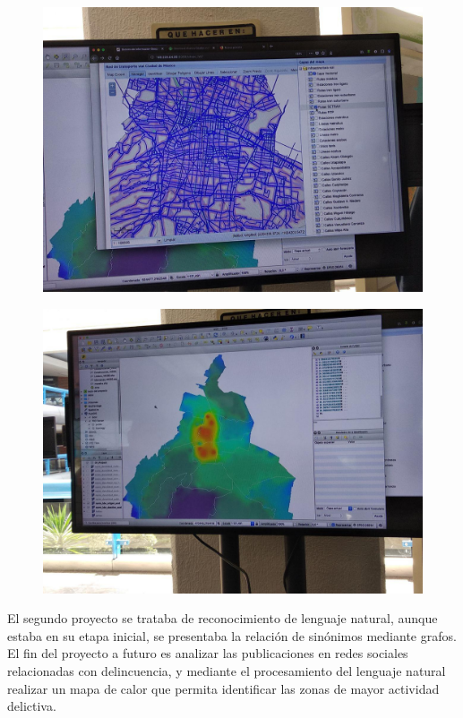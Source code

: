 \documentclass[11pt,letterpaper]{article}
\begin{document}
\begin{figure}[H]
	\centering
	\includegraphics[scale = 0.4]{images/mapa}
\end{figure}

\begin{figure}[H]
	\centering
	\includegraphics[scale = 0.4]{images/hot}
\end{figure}

El segundo proyecto se trataba de reconocimiento de lenguaje natural, aunque estaba en su etapa inicial, se presentaba la relación de sinónimos mediante grafos. El fin del proyecto a futuro es analizar las publicaciones en redes sociales relacionadas con delincuencia, y mediante el procesamiento del lenguaje natural realizar un mapa de calor que permita identificar las zonas de mayor actividad delictiva.
\end{document}
